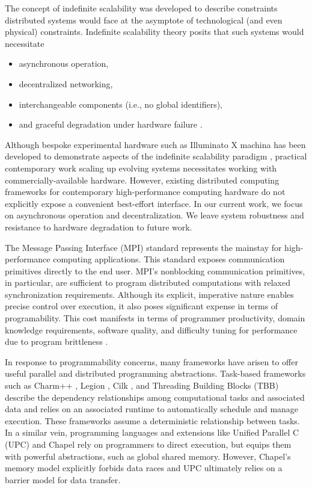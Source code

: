 The concept of indefinite scalability was developed to describe constraints distributed systems would face at the asymptote of technological (and even physical) constraints.
Indefinite scalability theory posits that such systems would necessitate
\begin{itemize}
    \item asynchronous operation,
    \item decentralized networking,
    \item interchangeable components (i.e., no global identifiers),
    \item and graceful degradation under hardware failure \cite{ackley2011pursue}.
\end{itemize}
Although bespoke experimental hardware such as Illuminato X machina has been developed to demonstrate aspects of the indefinite scalability paradigm \cite{ackley2011homeostatic}, practical contemporary work scaling up evolving systems necessitates working with commercially-available hardware.
However, existing distributed computing frameworks for contemporary high-performance computing hardware do not explicitly expose a convenient best-effort interface.
In our current work, we focus on asynchronous operation and decentralization.
We leave system robustness and resistance to hardware degradation to future work.

The Message Passing Interface (MPI) standard \cite{gropp1996high} represents the mainstay for high-performance computing applications.
This standard exposes communication primitives directly to the end user.
MPI's nonblocking communication primitives, in particular, are sufficient to program distributed computations with relaxed synchronization requirements.
Although its explicit, imperative nature enables precise control over execution, it also poses significant expense in terms of programability.
This cost manifests in terms of programmer productivity, domain knowledge requirements, software quality, and difficulty tuning for performance due to program brittleness \cite{gu2019comparative, tang2014mpi}.

In response to programmability concerns, many frameworks have arisen to offer useful parallel and distributed programming abstractions.
Task-based frameworks such as Charm++ \cite{kale1993charm++}, Legion \cite{bauer2012legion}, Cilk \cite{blumofe1996cilk}, and Threading Building Blocks (TBB) \cite{reinders2007intel} describe the dependency relationships among computational tasks and associated data and relies on an associated runtime to automatically schedule and manage execution.
These frameworks assume a deterministic relationship between tasks.
In a similar vein, programming languages and extensions like Unified Parallel C (UPC) \cite{el2006upc} and Chapel \cite{chamberlain2007parallel} rely on programmers to direct execution, but equips them with powerful abstractions, such as global shared memory.
However, Chapel's memory model explicitly forbids data races and UPC ultimately relies on a barrier model for data transfer.
